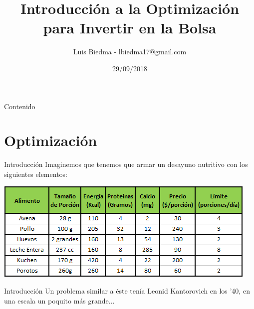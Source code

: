\documentclass[12pt,aspectratio=169]{beamer}
\title{Introducción a la Optimización para Invertir en la Bolsa}
\author{Luis Biedma - lbiedma17@gmail.com}
\date{29/09/2018}
\begin{document}
\maketitle

\begin{frame}{Contenido}
	\tableofcontents
\end{frame}


\section{Optimización}
\begin{frame}{Introducción}
Imaginemos que tenemos que armar un desayuno nutritivo con los siguientes elementos:

\begin{center}
\includegraphics[width=.8\paperwidth]{desayuno.png}
\end{center}
\end{frame}

\begin{frame}{Introducción}
Un problema similar a éste tenía Leonid Kantorovich en los '40, en una escala un poquito más grande...

\begin{center}
\end{center}
\end{frame}
\end{document}
